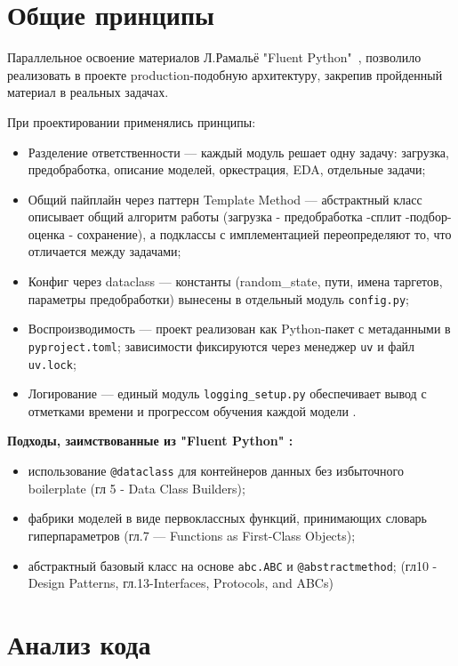 \documentclass[12pt,a4paper]{report}
\begin{document}
\section{Общие принципы}

Параллельное освоение материалов Л.Рамальё "Fluent Python"~\cite{fluent-python}, позволило реализовать в проекте production-подобную архитектуру, закрепив пройденный материал в реальных задачах.

При проектировании применялись принципы:
\begin{itemize}
    \item Разделение ответственности --- каждый модуль решает одну задачу: загрузка, предобработка, описание моделей, оркестрация, EDA, отдельные задачи;
    \item Общий пайплайн через паттерн Template Method --- абстрактный класс описывает общий алгоритм работы (загрузка - предобработка -сплит -подбор- оценка - сохранение), а подклассы с имплементацией переопределяют то, что отличается между задачами;
    \item Конфиг через dataclass --- константы (random\_state, пути, имена таргетов, параметры предобработки) вынесены в отдельный модуль \texttt{config.py};
    \item Воспроизводимость --- проект реализован как Python-пакет с метаданными в \texttt{pyproject.toml}; зависимости фиксируются через менеджер \texttt{uv} и файл \texttt{uv.lock};
    \item Логирование --- единый модуль \texttt{logging\_setup.py} обеспечивает вывод с отметками времени и прогрессом обучения каждой модели .
\end{itemize}

\textbf{Подходы, заимствованные из "Fluent Python" :}
\begin{itemize}
    \item использование \texttt{@dataclass} для контейнеров данных без избыточного boilerplate (гл 5 - Data Class Builders);
    \item фабрики моделей в виде первоклассных функций, принимающих словарь гиперпараметров (гл.7 --- Functions as First-Class Objects);
    \item абстрактный базовый класс на основе \texttt{abc.ABC} и \texttt{@abstractmethod}; (гл10 - Design Patterns, гл.13-Interfaces, Protocols, and ABCs)
\end{itemize}

\section{Анализ кода}
\end{document}
